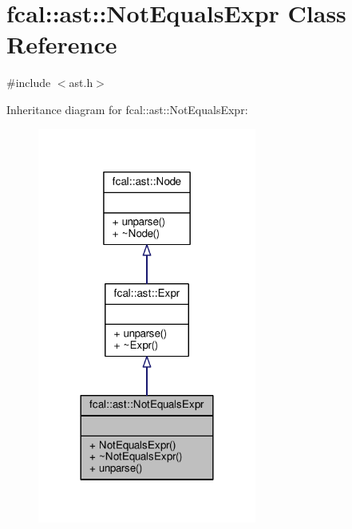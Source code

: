 \hypertarget{classfcal_1_1ast_1_1NotEqualsExpr}{}\section{fcal\+:\+:ast\+:\+:Not\+Equals\+Expr Class Reference}
\label{classfcal_1_1ast_1_1NotEqualsExpr}


{\ttfamily \#include $<$ast.\+h$>$}



Inheritance diagram for fcal\+:\+:ast\+:\+:Not\+Equals\+Expr\+:
\nopagebreak
\begin{figure}[H]
\begin{center}
\leavevmode
\includegraphics[width=204pt]{classfcal_1_1ast_1_1NotEqualsExpr__inherit__graph}
\end{center}
\end{figure}



